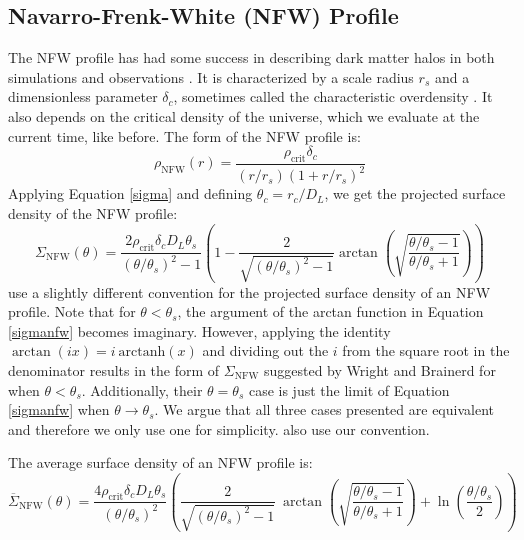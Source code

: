 \documentclass[10pt]{article}
\begin{document}
\subsection{Navarro-Frenk-White (NFW) Profile} \label{nfwsection}
The NFW profile has had some success in describing dark matter halos in both simulations and observations \citep{Navarro1997}. It is characterized by a scale radius $r_s$ and a dimensionless parameter $\delta_c$, sometimes called the characteristic overdensity \citep{Wright2000}. It also depends on the critical density of the universe, which we evaluate at the current time, like before. The form of the NFW profile is:
\begin{equation}
\rho_\mathrm{NFW}(r) = \frac{\rho_\mathrm{crit} \delta_c}{(r/r_s)\left(1 + r/r_s\right)^2}
\end{equation}
Applying Equation \ref{sigma} and defining $\theta_c = r_c/D_L$, we get the projected surface density of the NFW profile:
\begin{equation} \label{sigmanfw}
\Sigma_\mathrm{NFW}(\theta) = \frac{2 \rho_\mathrm{crit} \delta_c D_L \theta_s}{(\theta/\theta_s)^2 - 1} \left(1 - \frac{2}{\sqrt{(\theta/\theta_s)^2 - 1}} \arctan\left(\sqrt{\frac{\theta/\theta_s - 1}{\theta/\theta_s + 1}} \right) \right)
\end{equation}
\citet{Wright2000} use a slightly different convention for the projected surface density of an NFW profile. Note that for $\theta < \theta_s$, the argument of the arctan function in Equation \ref{sigmanfw} becomes imaginary. However, applying the identity $\arctan(i x) = i\ \mathrm{arctanh}(x)$ and dividing out the $i$ from the square root in the denominator results in the form of $\Sigma_\mathrm{NFW}$ suggested by Wright and Brainerd for when  $\theta < \theta_s$. Additionally, their $\theta = \theta_s$ case is just the limit of Equation \ref{sigmanfw} when $\theta \rightarrow \theta_s$. We argue that all three cases presented are equivalent and therefore we only use one for simplicity. \citet{Bartelmann2001} also use our convention.

The average surface density of an NFW profile is:
\begin{equation} \label{sigmabarnfw}
\overline{\Sigma}_\mathrm{NFW}(\theta) = \frac{4 \rho_\mathrm{crit} \delta_c D_L \theta_s}{(\theta/\theta_s)^2} \left(
    \frac{2}{\sqrt{(\theta/\theta_s)^2 - 1}} ~\arctan\left(\sqrt{\frac{\theta/\theta_s - 1}{\theta/\theta_s + 1}} \right) + \ln{\left(\frac{\theta/\theta_s}{2}\right)}
\right)
\end{equation}
\end{document}
